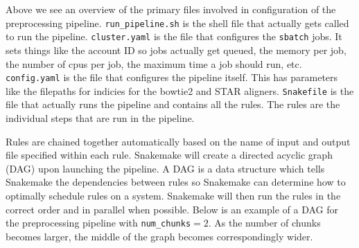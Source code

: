 \documentclass{article}
\begin{document}
    \noindent Above we see an overview of the primary files involved in configuration of the preprocessing pipeline. \texttt{run\_pipeline.sh} is the shell file that actually gets called to run the pipeline. \texttt{cluster.yaml} is the file that configures the \texttt{sbatch} jobs. It sets things like the account ID so jobs actually get queued, the memory per job, the number of cpus per job, the maximum time a job should run, etc. \texttt{config.yaml} is the file that configures the pipeline itself. This has parameters like the filepaths for indicies for the bowtie2 and STAR aligners. \texttt{Snakefile} is the file that actually runs the pipeline and contains all the rules. The rules are the individual steps that are run in the pipeline. 
    \vspace{5mm}
    
    \noindent Rules are chained together automatically based on the name of input and output file specified within each rule. Snakemake will create a directed acyclic graph (DAG) upon launching the pipeline. A DAG is a data structure which tells Snakemake the dependencies between rules so Snakemake can determine how to optimally schedule rules on a system. Snakemake will then run the rules in the correct order and in parallel when possible. Below is an example of a DAG for the preprocessing pipeline with \texttt{num\_chunks}$=2$. As the number of chunks becomes larger, the middle of the graph becomes correspondingly wider.
\end{document}
